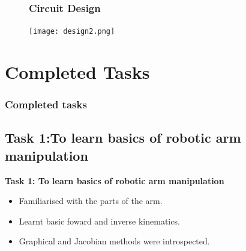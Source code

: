 \documentclass{beamer}
\begin{document}










\begin{frame}
\begin{figure}
\frametitle{Circuit Design}
\texttt{[image: design2.png]}
\end{figure}
\end{frame}



\section{Completed Tasks}
 \begin{frame}
 \frametitle{Completed tasks}
 \subsection{Task 1:To  learn basics of  robotic arm manipulation}
 \textbf{Task 1: To  learn basics of robotic arm manipulation}
 \begin{itemize}
 \item Familiarised with the parts of the arm.
 \item  Learnt basic foward and inverse kinematics.
 \item  Graphical and Jacobian methods were introspected.
 \end{itemize}

\end{frame}
\end{document}
